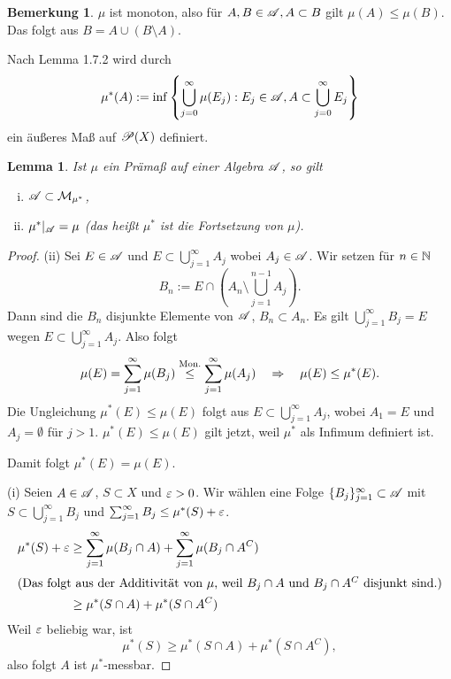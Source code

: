 \documentclass[
 a4paper,
 12pt,
 parskip=half
 ]{scrreprt}
\theoremstyle{plain}
\newtheorem{lem}[thm]{Lemma}
\theoremstyle{definition}
\newtheorem*{rmrk*}{Bemerkung}
\numberwithin{equation}{section}
\begin{document}
\begin{rmrk*}
 $\mu$ ist monoton, also für $A, B \in \mathscr{A}, A \subset B$ gilt $\mu(A) \le \mu(B)$. Das folgt aus $B = A \cup (B \setminus A)$.
\end{rmrk*}

Nach Lemma 1.7.2 wird durch
\[ \mu^*(A) := \inf \left\{ \bigcup_{j=0}^\infty \mu(E_j) : E_j \in \mathscr{A}, A \subset \bigcup_{j=0}^\infty E_j \right \} \]
ein äußeres Maß  auf $\mathscr{P}(X)$ definiert.

\begin{lem}
 Ist $\mu$ ein Prämaß auf einer Algebra $\mathscr{A}$, so gilt
 \begin{enumerate}[(i)]
  \item $\mathscr{A} \subset \mathcal{M}_{\mu^*}$,
  \item $\mu^* |_{\mathscr{A}} = \mu$ (das heißt $\mu^*$ ist die Fortsetzung von $\mu$).
 \end{enumerate}
\end{lem}

\begin{proof}
 (ii) Sei $E \in \mathscr{A}$ und $E \subset \bigcup_{j=1}^\infty A_j$ wobei $A_j \in \mathscr{A}$. Wir setzen für $n \in \mathbb{N}$
 \[ B_n := E \cap \left( A_n \setminus \bigcup_{j = 1}^{n-1} A_j \right). \]
 Dann sind die $B_n$ disjunkte Elemente von $\mathscr{A}$, $B_n \subset A_n$. Es gilt $\bigcup_{j=1}^\infty B_j = E$ wegen $E \subset \bigcup_{j=1}^\infty A_j$. Also folgt
 \[ \mu(E) = \sum_{j=1}^\infty \mu(B_j) \overset{\text{Mon.}}{\le} \sum_{j=1}^\infty \mu(A_j) \quad \Rightarrow \quad \mu(E) \le \mu^*(E). \]
 Die Ungleichung $\mu^*(E) \le \mu(E)$ folgt aus $E \subset \bigcup_{j=1}^\infty A_j$, wobei $A_1 = E$ und $A_j = \emptyset$ für $j > 1$. $\mu^*(E) \le \mu(E)$ gilt jetzt, weil $\mu^*$ als Infimum definiert ist.
 
 Damit folgt $\mu^*(E) = \mu(E)$.
 
 (i) Seien $A \in \mathscr{A}$, $S \subset X$ und $\varepsilon > 0$. Wir wählen eine Folge $\{ B_j \}_{j=1}^\infty \subset \mathscr{A}$ mit $S \subset \bigcup_{j=1}^\infty B_j$ und $\sum_{j=1}^\infty B_j \le \mu^*(S) + \varepsilon$.
 \begin{align*}
  \mu^*(S) + \varepsilon &\ge \sum_{j=1}^\infty \mu(B_j \cap A) + \sum_{j=1}^\infty \mu(B_j \cap A^C ) \\
  \intertext{(Das folgt aus der Additivität von $\mu$, weil $B_j \cap A$ und $B_j \cap A^C$ disjunkt sind.)}
  &\ge \mu^*( S \cap A ) + \mu^*( S \cap A^C )
 \end{align*}
 Weil $\varepsilon$ beliebig war, ist
 \[ \mu^*(S) \ge \mu^*(S \cap A) + \mu^*(S \cap A^C), \]
 also folgt $A$ ist $\mu^*$-messbar.
\end{proof}
\end{document}
